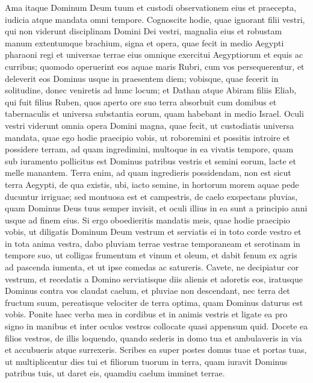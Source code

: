 \begin{biblechapter} 
\verse Ama itaque Dominum Deum tuum et custodi observationem eius et praecepta, iudicia atque mandata omni tempore. 
\verse Cognoscite hodie, quae ignorant filii vestri, qui non viderunt disciplinam Domini Dei vestri, magnalia eius et robustam manum extentumque brachium, 
\verse signa et opera, quae fecit in medio Aegypti pharaoni regi et universae terrae eius 
\verse omnique exercitui Aegyptiorum et equis ac curribus; quomodo operuerint eos aquae maris Rubri, cum vos persequerentur, et deleverit eos Dominus usque in praesentem diem; 
\verse vobisque, quae fecerit in solitudine, donec veniretis ad hunc locum; 
\verse et Dathan atque Abiram filiis Eliab, qui fuit filius Ruben, quos aperto ore suo terra absorbuit cum domibus et tabernaculis et universa substantia eorum, quam habebant in medio Israel. 
\verse Oculi vestri viderunt omnia opera Domini magna, quae fecit, 
\verse ut custodiatis universa mandata, quae ego hodie praecipio vobis, ut roboremini et possitis introire et possidere terram, ad quam ingredimini, 
\verse multoque in ea vivatis tempore, quam sub iuramento pollicitus est Dominus patribus vestris et semini eorum, lacte et melle manantem. 
\verse Terra enim, ad quam ingredieris possidendam, non est sicut terra Aegypti, de qua existis, ubi, iacto semine, in hortorum morem aquae pede ducuntur irriguae; 
\verse sed montuosa est et campestris, de caelo exspectans pluvias, 
\verse quam Dominus Deus tuus semper invisit, et oculi illius in ea sunt a principio anni usque ad finem eius. 
\verse Si ergo oboedieritis mandatis meis, quae hodie praecipio vobis, ut diligatis Dominum Deum vestrum et serviatis ei in toto corde vestro et in tota anima vestra, 
\verse dabo pluviam terrae vestrae temporaneam et serotinam in tempore suo, ut colligas frumentum et vinum et oleum, 
\verse et dabit fenum ex agris ad pascenda iumenta, et ut ipse comedas ac satureris. 
\verse Cavete, ne decipiatur cor vestrum, et recedatis a Domino serviatisque diis alienis et adoretis eos,  
\verse iratusque Dominus contra vos claudat caelum, et pluviae non descendant, nec terra det fructum suum, pereatisque velociter de terra optima, quam Dominus daturus est vobis. 
\verse Ponite haec verba mea in cordibus et in animis vestris et ligate ea pro signo in manibus et inter oculos vestros collocate quasi appensum quid. 
\verse Docete ea filios vestros, de illis loquendo, quando sederis in domo tua et ambulaveris in via et accubueris atque surrexeris. 
\verse Scribes ea super postes domus tuae et portas tuas, 
\verse ut multiplicentur dies tui et filiorum tuorum in terra, quam iuravit Dominus patribus tuis, ut daret eis, quamdiu caelum imminet terrae.  

\end{biblechapter}

